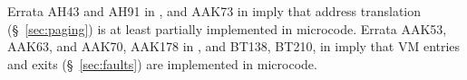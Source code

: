 Errata AH43 and AH91 in \cite{intel2010errata}, and AAK73 in
\cite{intel2015errata} imply that address translation (\S~\ref{sec:paging}) is
at least partially implemented in microcode. Errata AAK53, AAK63, and AAK70,
AAK178 in \cite{intel2015errata}, and BT138, BT210,  in \cite{intel2015errata2}
imply that VM entries and exits (\S~\ref{sec:faults}) are implemented in
microcode.
